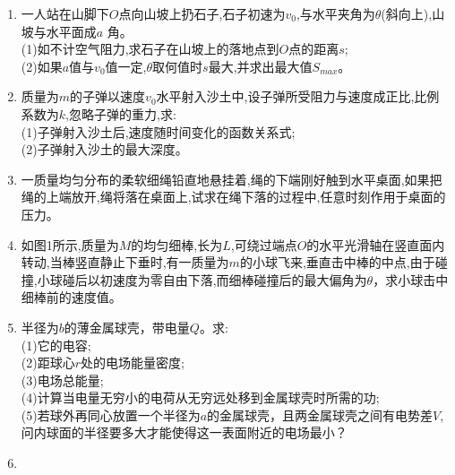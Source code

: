 
\begin{enumerate}
\item 一人站在山脚下$O$点向山坡上扔石子,石子初速为$v_0$,与水平夹角为$\theta$(斜向上),山坡与水平面成$a$ 角。\\
(1)如不计空气阻力,求石子在山坡上的落地点到$O$点的距离$s$;\\
(2)如果$a$值与$v_0$值一定,$\theta$取何值时$s$最大,并求出最大值$S_{max}$。
\item 质量为$m$的子弹以速度$v_0$水平射入沙土中,设子弹所受阻力与速度成正比,比例系数为$k$,忽略子弹的重力,求:\\
(1)子弹射入沙土后,速度随时间变化的函数关系式;\\
(2)子弹射入沙土的最大深度。
\item 一质量均匀分布的柔软细绳铅直地悬挂着,绳的下端刚好触到水平桌面,如果把绳的上端放开,绳将落在桌面上,试求在绳下落的过程中,任意时刻作用于桌面的压力。
\item 如图1所示,质量为$M$的均匀细棒,长为$L$,可绕过端点$O$的水平光滑轴在竖直面内转动,当棒竖直静止下垂时,有一质量为$m$的小球飞来,垂直击中棒的中点,由于碰撞,小球碰后以初速度为零自由下落,而细棒碰撞后的最大偏角为$\theta$，求小球击中细棒前的速度值。
\item 半径为$b$的薄金属球壳，带电量$Q$。求:\\
(1)它的电容;\\
(2)距球心$r$处的电场能量密度;\\
(3)电场总能量;\\
(4)计算当电量无穷小的电荷从无穷远处移到金属球壳时所需的功;\\
(5)若球外再同心放置一个半径为$a$的金属球壳，且两金属球壳之间有电势差$V$,问内球面的半径要多大才能使得这一表面附近的电场最小？
\item 
\end{enumerate}